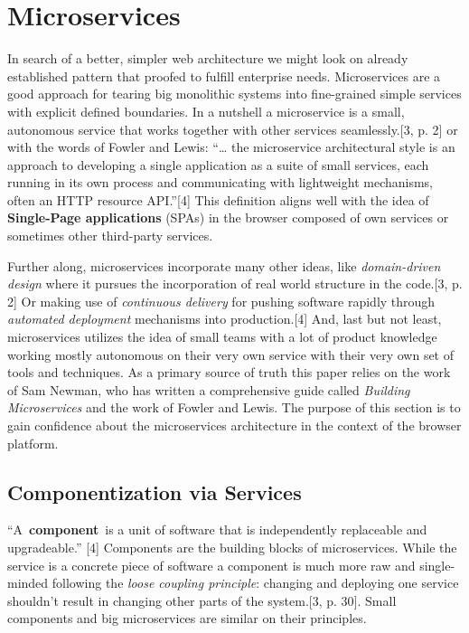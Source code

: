 \documentclass[]{article}
\begin{document}
\section{Microservices}\label{microservices}

In search of a better, simpler web architecture we might look on already
established pattern that proofed to fulfill enterprise needs.
Microservices are a good approach for tearing big monolithic systems
into fine-grained simple services with explicit defined boundaries. In a
nutshell a microservice is a small, autonomous service that works
together with other services seamlessly.{[}3, p. 2{]} or with the words
of Fowler and Lewis: ``\ldots{} the microservice architectural style is
an approach to developing a single application as a suite of small
services, each running in its own process and communicating with
lightweight mechanisms, often an HTTP resource API.''{[}4{]} This
definition aligns well with the idea of \textbf{Single-Page
applications} (SPAs) in the browser composed of own services or
sometimes other third-party services.

Further along, microservices incorporate many other ideas, like
\emph{domain-driven design} where it pursues the incorporation of real
world structure in the code.{[}3, p. 2{]} Or making use of
\emph{continuous delivery} for pushing software rapidly through
\emph{automated deployment} mechanisms into production.{[}4{]} And, last
but not least, microservices utilizes the idea of small teams with a lot
of product knowledge working mostly autonomous on their very own service
with their very own set of tools and techniques. As a primary source of
truth this paper relies on the work of Sam Newman, who has written a
comprehensive guide called \emph{Building Microservices} and the work of
Fowler and Lewis. The purpose of this section is to gain confidence
about the microservices architecture in the context of the browser
platform.

\subsection{Componentization via
Services}\label{componentization-via-services}

``A~\textbf{component}~is a unit of software that is independently
replaceable and upgradeable.'' {[}4{]} Components are the building
blocks of microservices. While the service is a concrete piece of
software a component is much more raw and single-minded following the
\emph{loose coupling principle}: changing and deploying one service
shouldn't result in changing other parts of the system.{[}3, p. 30{]}.
Small components and big microservices are similar on their principles.
\end{document}
